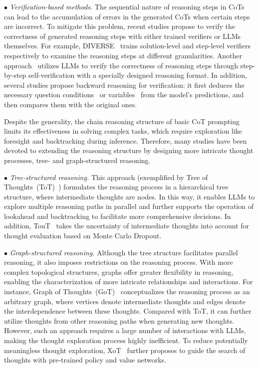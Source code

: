$\bullet$ \emph{Verification-based methods.} {
The sequential nature of reasoning steps in CoTs can lead to the accumulation of errors in the generated CoTs when certain steps are incorrect. 
To mitigate this problem, recent studies propose to verify the correctness of generated reasoning steps with either trained verifiers or LLMs themselves. 
For example, DIVERSE~\cite{Li-arxiv-2023-Making} trains solution-level and step-level verifiers respectively to examine the reasoning steps at different granularities. 
Another approach~\cite{Ling-arxiv-2023-Deductive} utilizes LLMs to verify the correctness of reasoning steps through step-by-step self-verification with a specially designed reasoning format.
In addition, several studies propose backward reasoning for verification: 
it first deduces the necessary question conditions~\cite{Xue-arxiv-2023-RCOT, Weng-arxiv-2023-Large} or variables~\cite{Jiang-arxiv-2023-Forward} {from the model's predictions}, and then compares them with the original ones.
}

{
Despite the generality, the chain reasoning structure of basic CoT prompting limits its effectiveness in solving complex tasks, which require exploration like foresight and backtracking during inference.
Therefore, many studies have been devoted to extending the reasoning structure by designing more intricate thought processes, \eg tree- and graph-structured reasoning. %
}

$\bullet$ \emph{Tree-structured reasoning.} 
This approach (exemplified by Tree of Thoughts~(ToT)~\cite{Yao-arxiv-2023-Tree, Long-arxiv-2023-Large}) formulates the reasoning process in a hierarchical tree structure, where intermediate thoughts are nodes.
{In this way, it enables  LLMs to explore multiple reasoning paths in parallel and further supports the operation of lookahead and backtracking to facilitate more comprehensive decisions.} 
In addition, TouT~\cite{Mo-arxiv-2023-Tree} takes the uncertainty of intermediate thoughts into account for thought evaluation based on Monte Carlo Dropout.

$\bullet$ \emph{Graph-structured reasoning.} {
Although the tree structure facilitates parallel reasoning, it also imposes restrictions on the reasoning process.
With more complex topological structures, graphs offer greater flexibility in reasoning, enabling the characterization of more intricate relationships and interactions.
For instance, Graph of Thoughts~(GoT)~\cite{Besta-arxiv-2023-Graph, Lei-arxiv-2023-Boosting} conceptualizes the reasoning process as an arbitrary graph, where vertices denote intermediate thoughts and edges denote the interdependence between these thoughts. 
{Compared with ToT, it can further utilize thoughts from other reasoning paths when generating new thoughts.}
However, such an approach requires a large number of interactions with LLMs, making the thought exploration process highly inefficient. 
} 
{
To reduce potentially meaningless thought exploration, XoT~\cite{ding-arxiv-2023-everything} further proposes to guide the search of thoughts with pre-trained policy and value networks.
}





